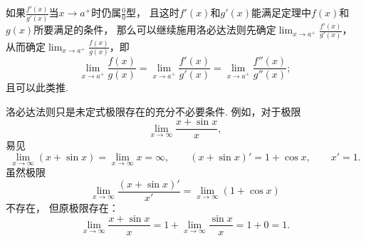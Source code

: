 如果\(\frac{f'(x)}{g'(x)}\)当\(x \to a^+\)时仍属\(\frac{0}{0}\)型，
且这时\(f'(x)\)和\(g'(x)\)能满足定理中\(f(x)\)和\(g(x)\)所要满足的条件，
那么可以继续施用洛必达法则先确定\(\lim_{x \to a^+} \frac{f'(x)}{g'(x)}\)，
从而确定\(\lim_{x \to a^+} \frac{f(x)}{g(x)}\)，即\[
	\lim_{x \to a^+} \frac{f(x)}{g(x)}
	= \lim_{x \to a^+} \frac{f'(x)}{g'(x)}
	= \lim_{x \to a^+} \frac{f''(x)}{g''(x)};
\]
且可以此类推.

洛必达法则只是未定式极限存在的充分不必要条件.
例如，对于极限\[
	\lim_{x\to\infty} \frac{x+\sin x}{x},
\]
易见\[
	\lim_{x\to\infty} (x+\sin x)
	= \lim_{x\to\infty} x
	= \infty,
	\qquad
	(x+\sin x)' = 1+\cos x, \qquad
	x' = 1.
\]
虽然极限\[
	\lim_{x\to\infty}\frac{(x+\sin x)'}{x'} = \lim_{x\to\infty}(1+\cos x)
\]不存在，
但原极限存在：\[
	\lim_{x\to\infty} \frac{x+\sin x}{x}
	= 1 + \lim_{x\to\infty} \frac{\sin x}{x}
	= 1 + 0 = 1.
\]

